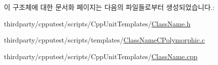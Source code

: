 이 구조체에 대한 문서화 페이지는 다음의 파일들로부터 생성되었습니다.\+:\begin{DoxyCompactItemize}
\item 
thirdparty/cpputest/scripts/\+Cpp\+Unit\+Templates/\hyperlink{_cpp_unit_templates_2_class_name_8h}{Class\+Name.\+h}\item 
thirdparty/cpputest/scripts/templates/\hyperlink{templates_2_class_name_c_polymorphic_8c}{Class\+Name\+C\+Polymorphic.\+c}\item 
thirdparty/cpputest/scripts/\+Cpp\+Unit\+Templates/\hyperlink{_cpp_unit_templates_2_class_name_8cpp}{Class\+Name.\+cpp}\end{DoxyCompactItemize}
